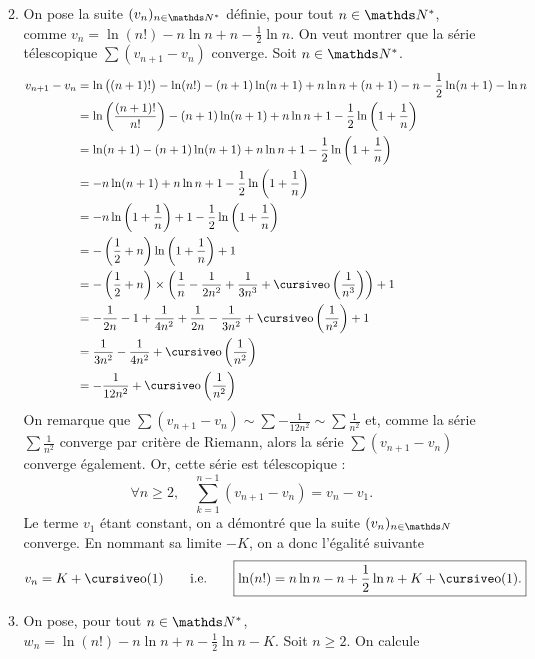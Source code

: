 \documentclass[a4paper]{article}
\begin{document}
\begin{enumerate}
\begin{enumerate}
\[					\]
				\item On pose la suite $(v_n)_{n\in\N^*}$\/ définie, pour tout $n \in \N^*$, comme $v_n = \ln(n!) - n \ln n + n - \frac{1}{2} \ln n$. On veut montrer que la série télescopique $\sum (v_{n+1} - v_n)$\/ converge. Soit $n \in \N^*$.
					\begin{align*}
						v_{n+1} - v_n &= \ln\big((n+1)!\big) - \ln(n!) -(n+1) \ln(n+1) + n \ln n + (n+1) - n - \frac{1}{2} \ln(n+1) - \ln n \\
						&= \ln\left( \frac{(n+1)!}{n!} \right) - (n+1) \ln(n+1) + n \ln n + 1 - \frac{1}{2} \ln\left( 1+ \frac{1}{n} \right) \\
						&= \ln(n+1) - (n+1) \ln(n+1) + n \ln n + 1 - \frac{1}{2} \ln\left(1+\frac{1}{n}\right) \\
						&= -n \ln(n+1) + n \ln n + 1 - \frac{1}{2} \ln\left( 1+ \frac{1}{n} \right)\\
						&= -n \ln\left( 1 + \frac{1}{n} \right) + 1 - \frac{1}{2}\ln\left( 1+ \frac{1}{n} \right) \\
						&= -\left( \frac{1}{2} + n \right) \ln\left( 1+ \frac{1}{n} \right) + 1 \\
						&= -\left( \frac{1}{2} + n \right)\times\left( \frac{1}{n} - \frac{1}{2n^2} + \frac{1}{3n^3} + \po\left( \frac{1}{n^3} \right)  \right) + 1\\
						&= -\frac{1}{2n} - 1 + \frac{1}{4n^2} + \frac{1}{2n} - \frac{1}{3n^2} + \po\left( \frac{1}{n^2} \right) + 1 \\
						&= \frac{1}{3n^2}- \frac{1}{4n^2} + \po\left( \frac{1}{n^2} \right) \\
						&= -\frac{1}{12n^2} + \po\left( \frac{1}{n^2} \right) \\
					\end{align*}
					On remarque que $\sum (v_{n+1} - v_n) \sim \sum -\frac{1}{12n^2} \sim \sum \frac{1}{n^2}$\/ et, comme la série $\sum \frac{1}{n^2}$\/ converge par critère de {\sc Riemann}, alors la série $\sum (v_{n+1} - v_n)$\/ converge également. Or, cette série est télescopique : \[
						\forall n \ge 2,\quad \sum_{k=1}^{n-1} (v_{n+1}- v_n) = v_n - v_1
					.\]
					Le terme $v_1$\/ étant constant, on a démontré que la suite $(v_n)_{n\in\N}$\/ converge. En nommant sa limite $-K$, on a donc l'égalité suivante \[
						v_n = K + \po(1)\qquad\text{i.e.}\qquad \boxed{\ln(n!) = n\ln n - n + \frac{1}{2} \ln n + K + \po(1).}
					\]
				\item
					On pose, pour tout $n \in \N^*$, $w_n = \ln(n!) - n \ln n + n - \frac{1}{2} \ln n - K$. Soit $n \ge 2$. On calcule

\end{enumerate}
\end{enumerate}
\end{document}
